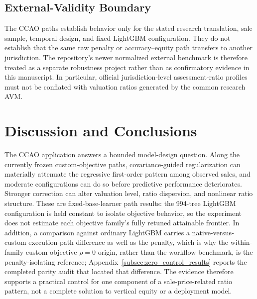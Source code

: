 \documentclass[10pt]{article}
\theoremstyle{definition}
\newcommand{\1}{\mathbf{1}}
\begin{document}
\subsection{External-Validity Boundary}
\label{subsec:external_results_boundary}

The CCAO paths establish behavior only for the stated research translation, sale sample, temporal design, and fixed LightGBM configuration. They do not establish that the same raw penalty or accuracy--equity path transfers to another jurisdiction. The repository's newer normalized external benchmark is therefore treated as a separate robustness project rather than as confirmatory evidence in this manuscript. In particular, official jurisdiction-level assessment-ratio profiles must not be conflated with valuation ratios generated by the common research AVM.


\section{Discussion and Conclusions}
\label{sec:discussion}

The CCAO application answers a bounded model-design question. Along the currently frozen custom-objective paths, covariance-guided regularization can materially attenuate the regressive first-order pattern among observed sales, and moderate configurations can do so before predictive performance deteriorates. Stronger correction can alter valuation level, ratio dispersion, and nonlinear ratio structure. These are fixed-base-learner path results: the 994-tree LightGBM configuration is held constant to isolate objective behavior, so the experiment does not estimate each objective family's fully retuned attainable frontier. In addition, a comparison against ordinary LightGBM carries a native-versus-custom execution-path difference as well as the penalty, which is why the within-family custom-objective $\rho=0$ origin, rather than the workflow benchmark, is the penalty-isolating reference; Appendix~\ref{subsec:zero_control_results} reports the completed parity audit that located that difference. The evidence therefore supports a practical control for one component of a sale-price-related ratio pattern, not a complete solution to vertical equity or a deployment model.
\end{document}
